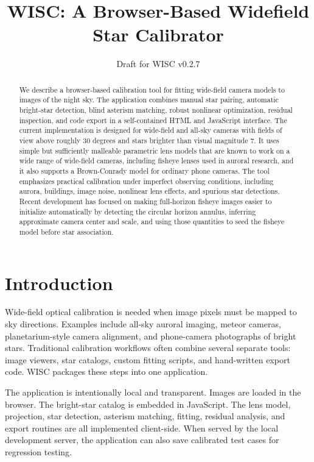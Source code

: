 \documentclass[11pt]{article}
\title{WISC: A Browser-Based Widefield Star Calibrator}
\author{\WiscAuthors}
\date{Draft for WISC v0.2.7}
\begin{document}
\maketitle

\begin{abstract}
We describe a browser-based calibration tool for fitting wide-field camera
models to images of the night sky. The application combines manual star
pairing, automatic bright-star detection, blind asterism matching, robust
nonlinear optimization, residual inspection, and code export in a self-contained
HTML and JavaScript interface. The current implementation is designed for
wide-field and all-sky cameras with fields of view above roughly 30 degrees and
stars brighter than visual magnitude 7. It uses simple but sufficiently
malleable parametric lens models that are known to work on a wide range of
wide-field cameras, including fisheye lenses used in auroral research, and it
also supports a Brown-Conrady model for ordinary phone cameras. The tool
emphasizes practical calibration under imperfect observing conditions,
including aurora, buildings, image noise, nonlinear lens effects, and spurious
star detections. Recent development has focused on making full-horizon fisheye
images easier to initialize automatically by detecting the circular horizon
annulus, inferring approximate camera center and scale, and using those
quantities to seed the fisheye model before star association.
\end{abstract}

\section{Introduction}

Wide-field optical calibration is needed when image pixels must be mapped to
sky directions. Examples include all-sky auroral imaging, meteor cameras,
planetarium-style camera alignment, and phone-camera photographs of bright
stars. Traditional calibration workflows often combine several separate tools:
image viewers, star catalogs, custom fitting scripts, and hand-written export
code. WISC packages these steps into one application.

The application is intentionally local and transparent. Images are loaded in the
browser. The bright-star catalog is embedded in JavaScript. The lens model,
projection, star detection, asterism matching, fitting, residual analysis, and
export routines are all implemented client-side. When served by the local
development server, the application can also save calibrated test cases for
regression testing.
\end{document}
